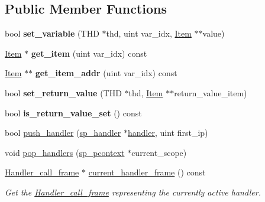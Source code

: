 \subsection*{Public Member Functions}
\begin{DoxyCompactItemize}
\item 
\mbox{\label{classsp__rcontext_a260a527c167de6f2c94db5fcad8ac831}} 
bool {\bfseries set\+\_\+variable} (T\+HD $\ast$thd, uint var\+\_\+idx, \mbox{\hyperlink{classItem}{Item}} $\ast$$\ast$value)
\item 
\mbox{\label{classsp__rcontext_a55b9e5ed062d4c752ba9f206a0957853}} 
\mbox{\hyperlink{classItem}{Item}} $\ast$ {\bfseries get\+\_\+item} (uint var\+\_\+idx) const
\item 
\mbox{\label{classsp__rcontext_a175818d47aaac8dd1b4839c81bc86d75}} 
\mbox{\hyperlink{classItem}{Item}} $\ast$$\ast$ {\bfseries get\+\_\+item\+\_\+addr} (uint var\+\_\+idx) const
\item 
\mbox{\label{classsp__rcontext_a4e0bab38afa524a4b59e35f8c0c37f09}} 
bool {\bfseries set\+\_\+return\+\_\+value} (T\+HD $\ast$thd, \mbox{\hyperlink{classItem}{Item}} $\ast$$\ast$return\+\_\+value\+\_\+item)
\item 
\mbox{\label{classsp__rcontext_ad4eae51f66782e114068e5ba6f360fac}} 
bool {\bfseries is\+\_\+return\+\_\+value\+\_\+set} () const
\item 
bool \mbox{\hyperlink{classsp__rcontext_a59a9f37626871fa3325799c5c3cf07ed}{push\+\_\+handler}} (\mbox{\hyperlink{classsp__handler}{sp\+\_\+handler}} $\ast$\mbox{\hyperlink{classhandler}{handler}}, uint first\+\_\+ip)
\item 
void \mbox{\hyperlink{classsp__rcontext_a26ec647bb1d2520182d8b5d1ea9f60ad}{pop\+\_\+handlers}} (\mbox{\hyperlink{classsp__pcontext}{sp\+\_\+pcontext}} $\ast$current\+\_\+scope)
\item 
\mbox{\label{classsp__rcontext_ad3401043b3c0b22f51b6710692cfabeb}} 
\mbox{\hyperlink{classsp__rcontext_1_1Handler__call__frame}{Handler\+\_\+call\+\_\+frame}} $\ast$ \mbox{\hyperlink{classsp__rcontext_ad3401043b3c0b22f51b6710692cfabeb}{current\+\_\+handler\+\_\+frame}} () const
\begin{DoxyCompactList}\small\item\em Get the \mbox{\hyperlink{classsp__rcontext_1_1Handler__call__frame}{Handler\+\_\+call\+\_\+frame}} representing the currently active handler. \end{DoxyCompactList}\item 
$$
\end{DoxyCompactItemize}
